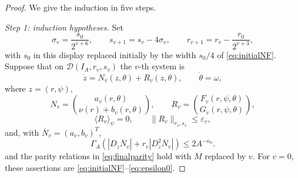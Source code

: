 \documentclass[11pt]{amsart}
\theoremstyle{remark}
\newcommand{\eps}{\varepsilon}
\newcommand{\av}[1]{\langle #1\rangle}
\newcommand{\norm}[1]{\lVert #1\rVert}
\newcommand{\cD}{\mathcal D}
\begin{document}
\begin{proof}
We give the induction in five steps.

\smallskip
\noindent\emph{Step 1: induction hypotheses.}
Set
\begin{equation}\label{eq:widths}
 \sigma_v=\frac{s_0}{2^{v+6}},\qquad
 s_{v+1}=s_v-4\sigma_v,\qquad
 r_{v+1}=r_v-\frac{r_0}{2^{v+3}},
\end{equation}
with $s_0$ in this display replaced initially by the width $s_0/4$
of \eqref{eq:initialNF}.  Suppose that on
$\cD(I_A,r_v,s_v)$ the $v$-th system is
\begin{equation}\label{eq:vthsystem}
 \dot z=N_v(z,\theta)+R_v(z,\theta),\qquad
 \dot\theta=\omega,
\end{equation}
where $z=(r,\psi)$,
\begin{equation}\label{eq:NvRv}
 N_v=
 \binom{a_v(r,\theta)}
       {\nu(r)+b_v(r,\theta)},\qquad
 R_v=\binom{F_v(r,\psi,\theta)}
           {G_v(r,\psi,\theta)},
\end{equation}
\[
 \av{R_v}_{\psi}=0,\qquad
 \norm{R_v}_{r_v,s_v}\leq\eps_v,
\]
and, with $\overline N_v=(a_v,b_v)^T$,
\begin{equation}\label{eq:averageTameV}
 \Gamma_A\left(
 |D_z\overline N_v|+
 r_v|D_z^2\overline N_v|
 \right)\leq2A^{-\kappa_0}.
\end{equation}
and the parity relations in \eqref{eq:finalparity} hold with $M$ replaced by
$v$.  For $v=0$, these assertions are \eqref{eq:initialNF}--\eqref{eq:epsilon0}.


\end{proof}
\end{document}
